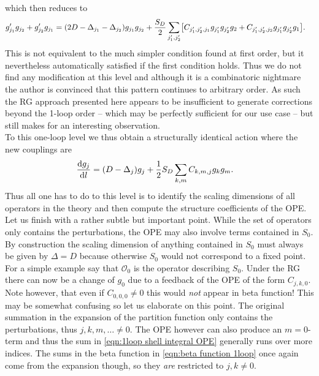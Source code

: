 \documentclass[english, parskip=full]{scrartcl}
\begin{document}
which then reduces to
\begin{align}
g_{j_1}'g_{j_2} + g_{j_2}'g_{j_1} &= (2D-\Delta_{j_1} - \Delta_{j_2})g_{j_1} g_{j_2} + \frac{S_D}{2} \sum_{j_1',j_2'} \klb*{C_{j_1',j_2',j_1} g_{j_1'} g_{j_2'} g_2 + C_{j_1',j_2',j_2} g_{j_1'} g_{j_2'} g_1}.
\end{align}
This is not equivalent to the much simpler condition found at first order, but it nevertheless automatically satisfied if the first condition holds.
Thus we do not find any modification at this level and although it is a combinatoric nightmare the author is convinced that this pattern continues to arbitrary order.
As such the RG approach presented here appears to be insufficient to generate corrections beyond the 1-loop order -- which may be perfectly sufficient for our use case -- but still makes for an interesting observation.
\\
To this one-loop level we thus obtain a structurally identical action where the new couplings are
\begin{align}
\frac{\text{d} g_j}{\text{d} l} &= (D - \Delta_j)g_j + \frac{1}{2} S_D \sum_{k,m} C_{k,m,j} g_k g_m.\label{eqn:beta function 1loop}
\end{align}
Thus all one has to do to this level is to identify the scaling dimensions of all operators in the theory and then compute the structure coefficients of the OPE.\\
Let us finish with a rather subtle but important point.
While the set of operators only contains the perturbations, the OPE may also involve terms contained in $S_0$.
By construction the scaling dimension of anything contained in $S_0$ must always be given by $\Delta=D$ because otherwise $S_0$ would not correspond to a fixed point.
For a simple example say that $\mathcal{O}_0$ is the operator describing $S_0$.
Under the RG there can now be a change of $g_0$ due to a feedback of the OPE of the form $C_{j,k,0}$.
Note however, that even if $C_{0,0,0} \neq 0$ this would \emph{not} appear in beta function!
This may be somewhat confusing so let us elaborate on this point.
The original summation in the expansion of the partition function only contains the perturbations, thus $j,k,m,\dots\neq 0$.
The OPE however can also produce an $m=0$-term and thus the sum in \autoref{eqn:1loop shell integral OPE} generally runs over more indices.
The sums in the beta function in \autoref{eqn:beta function 1loop} once again come from the expansion though, so they \emph{are} restricted to $j,k\neq 0$.
\end{document}
